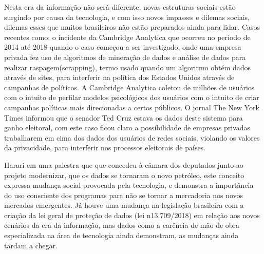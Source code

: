 \documentclass[article, 11pt, oneside, a4paper, english, brazil, sumario=tradicional]{abntex2}
\begin{document}
    Nesta era da informação não será diferente, novas estruturas sociais estão
surgindo por causa da tecnologia, e com isso novos impasses e dilemas sociais,
dilemas esses que muitos brasileiros não estão preparados ainda para lidar. Casos
recentes como: o incidente da Cambridge Analytica que ocorreu no periodo de 2014 até 2018 quando o caso começou a ser investigado, onde uma empresa privada fez
uso de algoritmos de mineração de dados e análise de dados para realizar
raspagem(scrapping), termo usado quando um algoritmo obtém dados através de
sites, para interferir na política dos Estados Unidos através de campanhas de
políticos. A Cambridge Analytica coletou de milhões de usuários
com o intuito de perfilar modelos psicológicos dos usuários com o intuito de
criar campanhas políticas mais direcionadas a certos públicos. O jornal The New
York Times informou que o senador Ted Cruz estava os dados deste sistema para
ganho eleitoral, com este caso ficou claro a possibilidade de empresas privadas
trabalharem em cima dos dados dos usuários de redes sociais, violando os valores
da privacidade, para interferir nos processos eleitorais de países.

    Harari em uma palestra que que concedeu à câmara dos deputados junto ao projeto modernizar,
que os dados se tornaram o novo petróleo, este conceito expressa mudança social provocada pela tecnologia,
e demonstra a importância do uso consciente dos programas para não se tornar a
mercadoria nos novos mercados emergentes. Já houve uma mudança na legislação brasileira
com a criação da lei geral de proteção de dados (lei n13.709/2018) em relação aos novos
cenários da era da informação, mas dados como a carência de mão de obra especializada na área
de tecnologia ainda demonstram, as mudanças ainda tardam a chegar.
\end{document}
